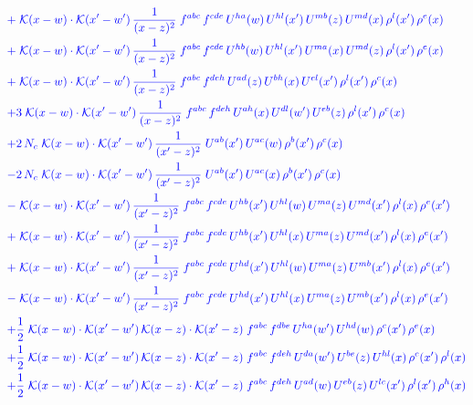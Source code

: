 \documentclass[9pt]{article}
\numberwithin{equation}{section}
\begin{document}
\begin{align}
&{\color{blue}+\;\mathcal{K}(x-w)\cdot\mathcal{K}(x'-w')\,\frac{1}{(x-z)^{2}}\;f^{abc}\,f^{cde}\,U^{ha}(w)\,U^{hl}(x')\,U^{mb}(z)\,U^{md}(x)\,\rho^{l}(x')\,\rho^{e}(x)}\notag\\
&{\color{blue}+\;\mathcal{K}(x-w)\cdot\mathcal{K}(x'-w')\,\frac{1}{(x-z)^{2}}\;f^{abc}\,f^{cde}\,U^{hb}(w)\,U^{hl}(x')\,U^{ma}(x)\,U^{md}(z)\,\rho^{l}(x')\,\rho^{e}(x)}\notag\\
&{\color{blue}+\;\mathcal{K}(x-w)\cdot\mathcal{K}(x'-w')\,\frac{1}{(x-z)^{2}}\;f^{abc}\,f^{deh}\,U^{ad}(z)\,U^{bh}(x)\,U^{el}(x')\,\rho^{l}(x')\,\rho^{c}(x)}\notag\\
&{\color{blue}+3\;\mathcal{K}(x-w)\cdot\mathcal{K}(x'-w')\,\frac{1}{(x-z)^{2}}\;f^{abc}\,f^{deh}\,U^{ah}(x)\,U^{dl}(w')\,U^{eb}(z)\,\rho^{l}(x')\,\rho^{c}(x)}\notag\\
&{\color{blue}+2\,N_c\;\mathcal{K}(x-w)\cdot\mathcal{K}(x'-w')\,\frac{1}{(x'-z)^{2}}\;U^{ab}(x')\,U^{ac}(w)\,\rho^{b}(x')\,\rho^{c}(x)}\notag\\
&{\color{blue}-2\,N_c\;\mathcal{K}(x-w)\cdot\mathcal{K}(x'-w')\,\frac{1}{(x'-z)^{2}}\;U^{ab}(x')\,U^{ac}(x)\,\rho^{b}(x')\,\rho^{c}(x)}\notag\\
&{\color{blue}-\;\mathcal{K}(x-w)\cdot\mathcal{K}(x'-w')\,\frac{1}{(x'-z)^{2}}\;f^{abc}\,f^{cde}\,U^{hb}(x')\,U^{hl}(w)\,U^{ma}(z)\,U^{md}(x')\,\rho^{l}(x)\,\rho^{e}(x')}\notag\\
&{\color{blue}+\;\mathcal{K}(x-w)\cdot\mathcal{K}(x'-w')\,\frac{1}{(x'-z)^{2}}\;f^{abc}\,f^{cde}\,U^{hb}(x')\,U^{hl}(x)\,U^{ma}(z)\,U^{md}(x')\,\rho^{l}(x)\,\rho^{e}(x')}\notag\\
&{\color{blue}+\;\mathcal{K}(x-w)\cdot\mathcal{K}(x'-w')\,\frac{1}{(x'-z)^{2}}\;f^{abc}\,f^{cde}\,U^{hd}(x')\,U^{hl}(w)\,U^{ma}(z)\,U^{mb}(x')\,\rho^{l}(x)\,\rho^{e}(x')}\notag\\
&{\color{blue}-\;\mathcal{K}(x-w)\cdot\mathcal{K}(x'-w')\,\frac{1}{(x'-z)^{2}}\;f^{abc}\,f^{cde}\,U^{hd}(x')\,U^{hl}(x)\,U^{ma}(z)\,U^{mb}(x')\,\rho^{l}(x)\,\rho^{e}(x')}\notag\\
&{\color{blue}+\frac{1}{2}\;\mathcal{K}(x-w)\cdot\mathcal{K}(x'-w')\,\mathcal{K}(x-z)\cdot\mathcal{K}(x'-z)\;f^{abc}\,f^{dbe}\,U^{ha}(w')\,U^{hd}(w)\,\rho^{c}(x')\,\rho^{e}(x)}\notag\\
&{\color{blue}+\frac{1}{2}\;\mathcal{K}(x-w)\cdot\mathcal{K}(x'-w')\,\mathcal{K}(x-z)\cdot\mathcal{K}(x'-z)\;f^{abc}\,f^{deh}\,U^{da}(w')\,U^{be}(z)\,U^{hl}(x)\,\rho^{c}(x')\,\rho^{l}(x)}\notag\\
&{\color{blue}+\frac{1}{2}\;\mathcal{K}(x-w)\cdot\mathcal{K}(x'-w')\,\mathcal{K}(x-z)\cdot\mathcal{K}(x'-z)\;f^{abc}\,f^{deh}\,U^{ad}(w)\,U^{eb}(z)\,U^{lc}(x')\,\rho^{l}(x')\,\rho^{h}(x)}\notag\\

\end{align}
\end{document}
